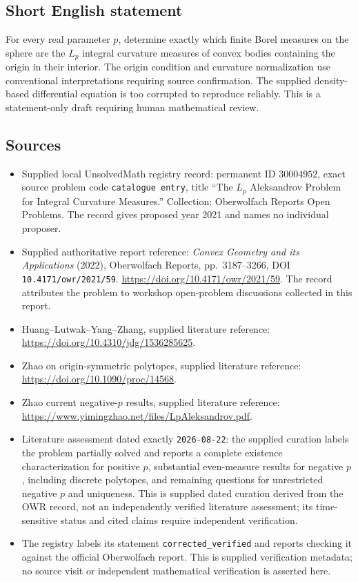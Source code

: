 \documentclass[11pt]{article}
\begin{document}
\subsection{Short English statement}
For every real parameter \(p\), determine exactly which finite Borel measures on the sphere are the \(L_p\) integral curvature measures of convex bodies containing the origin in their interior. The origin condition and curvature normalization use conventional interpretations requiring source confirmation. The supplied density-based differential equation is too corrupted to reproduce reliably. This is a statement-only draft requiring human mathematical review.
\subsection{Sources}
\begin{itemize}
\item Supplied local UnsolvedMath registry record: permanent ID \(30004952\), exact source problem code \texttt{catalogue entry}, title ``The \(L_p\) Aleksandrov Problem for Integral Curvature Measures.'' Collection: Oberwolfach Reports Open Problems. The record gives proposed year 2021 and names no individual proposer.
\item Supplied authoritative report reference: \emph{Convex Geometry and its Applications} (2022), Oberwolfach Reports, pp.~3187--3266, DOI \texttt{10.4171/owr/2021/59}. \url{https://doi.org/10.4171/owr/2021/59}. The record attributes the problem to workshop open-problem discussions collected in this report.
\item Huang--Lutwak--Yang--Zhang, supplied literature reference: \url{https://doi.org/10.4310/jdg/1536285625}.
\item Zhao on origin-symmetric polytopes, supplied literature reference: \url{https://doi.org/10.1090/proc/14568}.
\item Zhao current negative-\(p\) results, supplied literature reference: \url{https://www.yimingzhao.net/files/LpAleksandrov.pdf}.
\item Literature assessment dated exactly \texttt{2026-08-22}: the supplied curation labels the problem partially solved and reports a complete existence characterization for positive \(p\), substantial even-measure results for negative \(p\), including discrete polytopes, and remaining questions for unrestricted negative \(p\) and uniqueness. This is supplied dated curation derived from the OWR record, not an independently verified literature assessment; its time-sensitive status and cited claims require independent verification.
\item The registry labels its statement \texttt{corrected\_verified} and reports checking it against the official Oberwolfach report. This is supplied verification metadata; no source visit or independent mathematical verification is asserted here.
\end{itemize}
\end{document}
